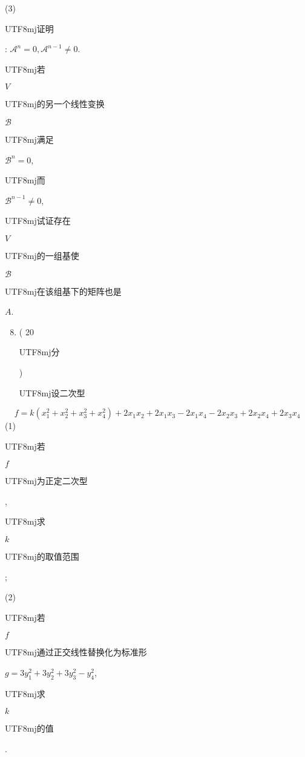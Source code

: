 \documentclass[10pt]{article}
\begin{document}
(3) \begin{CJK}{UTF8}{mj}证明\end{CJK}: $\mathscr{A}^{n}=0, \mathscr{A}^{n-1} \neq 0$.

\begin{CJK}{UTF8}{mj}若\end{CJK} $V$ \begin{CJK}{UTF8}{mj}的另一个线性变换\end{CJK} $\mathscr{B}$ \begin{CJK}{UTF8}{mj}满足\end{CJK} $\mathscr{B}^{n}=0$, \begin{CJK}{UTF8}{mj}而\end{CJK} $\mathscr{B}^{n-1} \neq 0$, \begin{CJK}{UTF8}{mj}试证存在\end{CJK} $V$ \begin{CJK}{UTF8}{mj}的一组基使\end{CJK} $\mathscr{B}$ \begin{CJK}{UTF8}{mj}在该组基下的矩阵也是\end{CJK} $A$.

\begin{enumerate}
  \setcounter{enumi}{7}
  \item ( 20 \begin{CJK}{UTF8}{mj}分\end{CJK}) \begin{CJK}{UTF8}{mj}设二次型\end{CJK}
\end{enumerate}
$$
f=k\left(x_{1}^{2}+x_{2}^{2}+x_{3}^{2}+x_{4}^{2}\right)+2 x_{1} x_{2}+2 x_{1} x_{3}-2 x_{1} x_{4}-2 x_{2} x_{3}+2 x_{2} x_{4}+2 x_{3} x_{4}
$$
(1) \begin{CJK}{UTF8}{mj}若\end{CJK} $f$ \begin{CJK}{UTF8}{mj}为正定二次型\end{CJK}, \begin{CJK}{UTF8}{mj}求\end{CJK} $k$ \begin{CJK}{UTF8}{mj}的取值范围\end{CJK};

(2) \begin{CJK}{UTF8}{mj}若\end{CJK} $f$ \begin{CJK}{UTF8}{mj}通过正交线性替换化为标准形\end{CJK} $g=3 y_{1}^{2}+3 y_{2}^{2}+3 y_{3}^{2}-y_{4}^{2}$, \begin{CJK}{UTF8}{mj}求\end{CJK} $k$ \begin{CJK}{UTF8}{mj}的值\end{CJK}.
\end{document}
